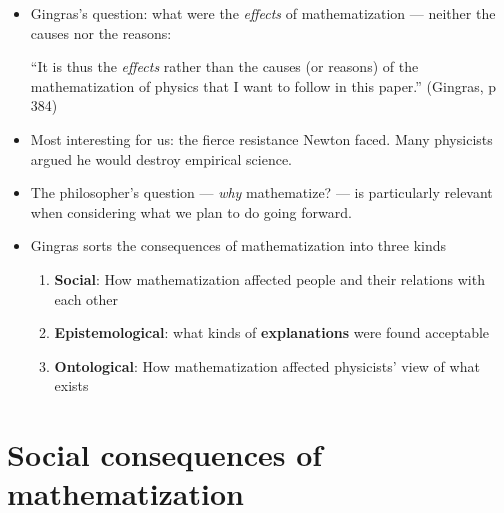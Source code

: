 \documentclass[fleqn]{beamer}
\newcommand{\kw}[1]{\textbf{#1}}
\begin{document}
\begin{frame}

  \begin{itemize}
  \item Gingras's question: what were the \emph{effects} of
    mathematization --- neither the causes nor the reasons:

    ``It is thus the \emph{effects} rather than the causes (or
    reasons) of the mathematization of physics that I want to follow
    in this paper.'' (Gingras, p 384)

  \item Most interesting for us: the fierce resistance Newton faced.
    Many physicists argued he would destroy empirical science.

  \item The philosopher's question --- \emph{why} mathematize? ---
    is particularly relevant when considering what we plan to do going
    forward.
  \end{itemize}

\end{frame}

\begin{frame}

  \begin{itemize}
  \item Gingras sorts the consequences of mathematization into three
    kinds
    \begin{enumerate}
    \item \kw{Social}: How mathematization affected people and their
      relations with each other
    \item \kw{Epistemological}: what kinds of \kw{explanations} were
      found acceptable
    \item \kw{Ontological}: How mathematization affected physicists'
      view of what exists
    \end{enumerate}
  \end{itemize}

\end{frame}

\section{Social consequences of mathematization}
\end{document}
